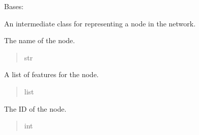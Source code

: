 \documentclass[letterpaper,10pt,english]{sphinxmanual}
\begin{document}
\begin{fulllineitems}
\label{\detokenize{nodes:nodes.nodeBuilder.Node}}
\pysigstartsignatures
\pysiglinewithargsret
{}
{}
{}
\pysigstopsignatures
\sphinxAtStartPar
Bases: 

\sphinxAtStartPar
An intermediate class for representing a node in the network.

\begin{fulllineitems}
\label{\detokenize{nodes:nodes.nodeBuilder.Node.name}}
\pysigstartsignatures
\pysigline
{}
\pysigstopsignatures
\sphinxAtStartPar
The name of the node.
\begin{quote}\begin{description}
\sphinxAtStartPar
str

\end{description}\end{quote}

\end{fulllineitems}


\begin{fulllineitems}
\label{\detokenize{nodes:nodes.nodeBuilder.Node.features}}
\pysigstartsignatures
\pysigline
{}
\pysigstopsignatures
\sphinxAtStartPar
A list of features for the node.
\begin{quote}\begin{description}
\sphinxAtStartPar
list

\end{description}\end{quote}

\end{fulllineitems}


\begin{fulllineitems}
\label{\detokenize{nodes:nodes.nodeBuilder.Node.ID}}
\pysigstartsignatures
\pysigline
{}
\pysigstopsignatures
\sphinxAtStartPar
The ID of the node.
\begin{quote}\begin{description}
\sphinxAtStartPar
int


\end{description}
\end{quote}
\end{fulllineitems}
\end{fulllineitems}
\end{document}
